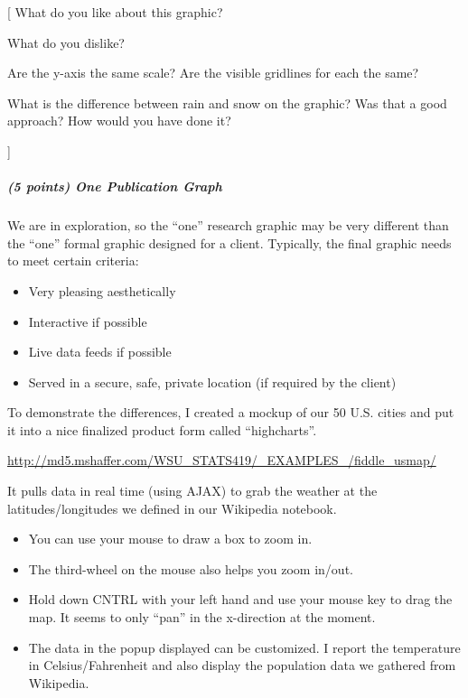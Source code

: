 \documentclass[
]{article}
\providecommand{\tightlist}{%
  \setlength{\itemsep}{0pt}\setlength{\parskip}{0pt}}
\begin{document}
{[} What do you like about this graphic?

What do you dislike?

Are the y-axis the same scale? Are the visible gridlines for each the
same?

What is the difference between rain and snow on the graphic? Was that a
good approach? How would you have done it?

{]}

\hypertarget{points-one-publication-graph}{%
\subparagraph{(5 points) One Publication
Graph}\label{points-one-publication-graph}}

We are in exploration, so the ``one'' research graphic may be very
different than the ``one'' formal graphic designed for a client.
Typically, the final graphic needs to meet certain criteria:

\begin{itemize}
\tightlist
\item
  Very pleasing aesthetically
\item
  Interactive if possible
\item
  Live data feeds if possible
\item
  Served in a secure, safe, private location (if required by the client)
\end{itemize}

To demonstrate the differences, I created a mockup of our 50 U.S. cities
and put it into a nice finalized product form called ``highcharts''.

\url{http://md5.mshaffer.com/WSU_STATS419/_EXAMPLES_/fiddle_usmap/}

It pulls data in real time (using AJAX) to grab the weather at the
latitudes/longitudes we defined in our Wikipedia notebook.

\begin{itemize}
\tightlist
\item
  You can use your mouse to draw a box to zoom in.\\
\item
  The third-wheel on the mouse also helps you zoom in/out.
\item
  Hold down CNTRL with your left hand and use your mouse key to drag the
  map. It seems to only ``pan'' in the x-direction at the moment.\\
\item
  The data in the popup displayed can be customized. I report the
  temperature in Celsius/Fahrenheit and also display the population data
  we gathered from Wikipedia.
\end{itemize}
\end{document}

